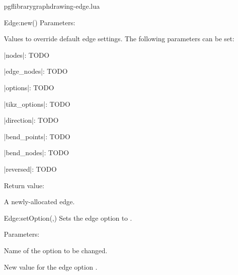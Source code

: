\begin{filedescription}{pgflibrarygraphdrawing-edge.lua}
\begin{luacommand}{{Edge:new}()}
Parameters:
\begin{parameterdescription}
	\item[\meta{values}] Values to override default edge settings. The following parameters can be set:\par |nodes|: TODO \par |edge_nodes|: TODO \par |options|: TODO \par |tikz_options|: TODO \par |direction|: TODO \par |bend_points|: TODO \par |bend_nodes|: TODO \par |reversed|: TODO \par 
\end{parameterdescription}


Return value:
\begin{parameterdescription} 
  \item[] A newly-allocated edge. 
\end{parameterdescription}


\end{luacommand}
\begin{luacommand}{{Edge:setOption}(,)}
Sets the edge option  to . 

Parameters:
\begin{parameterdescription}
	\item[\meta{name}] Name of the option to be changed.\item[\meta{value}] New value for the edge option . 
\end{parameterdescription}



\end{luacommand}

\end{filedescription}